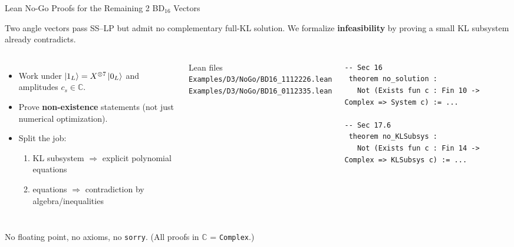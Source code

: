 \documentclass[aspectratio=169,t]{beamer}
\newcommand{\CC}{\mathbb{C}}
\newcommand{\code}[1]{\texttt{\small #1}}
\begin{document}
\begin{frame}[fragile]{Lean No-Go Proofs for the Remaining 2 BD$_{16}$ Vectors}

Two angle vectors pass SS--LP but admit \alert{no} complementary full-KL solution.
We formalize \textbf{infeasibility} by proving a small KL subsystem already contradicts.

\begin{columns}[T]
\begin{itemize}\setlength\itemsep{2pt}
\item Work under $\ket{1_L}=X^{\otimes 7}\ket{0_L}$ and amplitudes $c_s\in\CC$.
\item Prove \textbf{non-existence} statements (not just numerical optimization).
\item Split the job:
  \begin{enumerate}\setlength\itemsep{0pt}
  \item KL subsystem $\Rightarrow$ explicit polynomial equations
  \item equations $\Rightarrow$ contradiction by algebra/inequalities
  \end{enumerate}
\end{itemize}

\begin{exampleblock}{Lean files}
\code{Examples/D3/NoGo/BD16\_1112226.lean}\\
\code{Examples/D3/NoGo/BD16\_0112335.lean}
\end{exampleblock}

\begin{lstlisting}[style=lean,basicstyle=\ttfamily\scriptsize]
-- Sec 16
 theorem no_solution :
   Not (Exists fun c : Fin 10 -> Complex => System c) := ...

-- Sec 17.6
 theorem no_KLSubsys :
   Not (Exists fun c : Fin 14 -> Complex => KLSubsys c) := ...
\end{lstlisting}
\end{columns}

\textcolor{Slate}{\small No floating point, no axioms, no \code{sorry}. (All proofs in $\CC$ = \code{Complex}.)}
\end{frame}
\end{document}
